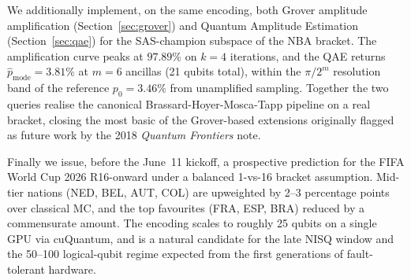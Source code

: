 \documentclass[11pt]{article}
\begin{document}
We additionally implement, on the same encoding, both Grover
amplitude amplification (Section~\ref{sec:grover}) and Quantum
Amplitude Estimation (Section~\ref{sec:qae}) for the SAS-champion
subspace of the NBA bracket. The amplification curve peaks at
$97.89\%$ on $k = 4$ iterations, and the QAE returns
$\hat p_{\text{mode}} = 3.81\%$ at $m = 6$ ancillas (21 qubits
total), within the $\pi/2^m$ resolution band of the reference
$p_0 = 3.46\%$ from unamplified sampling. Together the two queries
realise the canonical Brassard-Hoyer-Mosca-Tapp pipeline on a real
bracket, closing the most basic of the Grover-based extensions
originally flagged as future work by the 2018 \emph{Quantum
Frontiers} note.

Finally we issue, before the June~11 kickoff, a prospective
prediction for the FIFA World Cup 2026 R16-onward under a balanced
1-vs-16 bracket assumption. Mid-tier nations (NED, BEL, AUT, COL)
are upweighted by 2--3 percentage points over classical MC, and the
top favourites (FRA, ESP, BRA) reduced by a commensurate amount.
The encoding scales to roughly 25 qubits on a single GPU via
cuQuantum, and is a natural candidate for the late NISQ window and
the 50--100 logical-qubit regime expected from the first generations
of fault-tolerant hardware.



\end{document}
